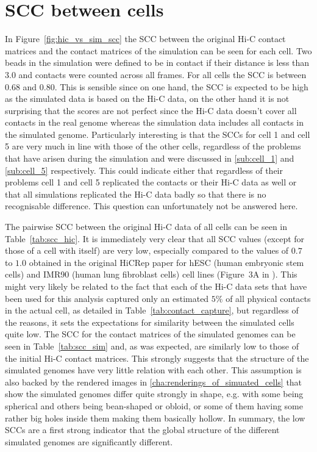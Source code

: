 \section{SCC between cells} %
\label{sec:scc_between_cells}

In Figure~\ref{fig:hic_vs_sim_scc} the SCC between the original Hi-C contact matrices and the contact matrices of the simulation can be seen for each cell. Two beads in the simulation were defined to be in contact if their distance is less than \(3.0\) and contacts were counted across all frames. For all cells the SCC is between 0.68 and 0.80. This is sensible since on one hand, the SCC is expected to be high as the simulated data is based on the Hi-C data, on the other hand it is not surprising that the scores are not perfect since the Hi-C data doesn’t cover all contacts in the real genome whereas the simulation data includes all contacts in the simulated genome. Particularly interesting is that the SCCs for cell 1 and cell 5 are very much in line with those of the other cells, regardless of the problems that have arisen during the simulation and were discussed in \ref{sub:cell_1} and \ref{sub:cell_5} respectively. This could indicate either that regardless of their problems cell 1 and cell 5 replicated the contacts or their Hi-C data as well or that all simulations replicated the Hi-C data badly so that there is no recognisable difference. This question can unfortunately not be answered here.

The pairwise SCC between the original Hi-C data of all cells can be seen in Table~\ref{tab:scc_hic}. It is immediately very clear that all SCC values (except for those of a cell with itself) are very low, especially compared to the values of \(0.7\) to \(1.0\) obtained in the original HiCRep paper for hESC (human embryonic stem cells) and IMR90 (human lung fibroblast cells) cell lines (Figure~3A in \cite{yang_hicrep_2017}). This might very likely be related to the fact that each of the Hi-C data sets that have been used for this analysis captured only an estimated \(5\%\) of all physical contacts in the actual cell, as detailed in Table~\ref{tab:contact_capture}, but regardless of the reasons, it sets the expectations for similarity between the simulated cells quite low. The SCC for the contact matrices of the simulated genomes can be seen in Table~\ref{tab:scc_sim} and, as was expected, are similarly low to those of the initial Hi-C contact matrices. This strongly suggests that the structure of the simulated genomes have very little relation with each other. This assumption is also backed by the rendered images in \ref{cha:renderings_of_simuated_cells} that show the simulated genomes differ quite strongly in shape, e.g. with some being spherical and others being bean-shaped or obloid, or some of them having some rather big holes inside them making them basically hollow. In summary, the low SCCs are a first strong indicator that the global structure of the different simulated genomes are significantly different.

